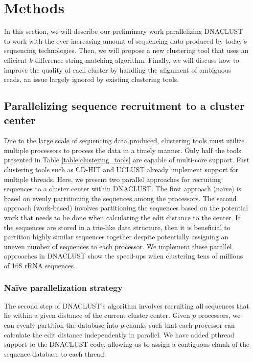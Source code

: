 \section{Methods}

In this section, we will describe our preliminary work parallelizing DNACLUST to work with the ever-increasing amount of sequencing data produced by today's sequencing technologies.
Then, we will propose a new clustering tool that uses an efficient $k$-difference string matching algorithm.
Finally, we will discuss how to improve the quality of each cluster by handling the alignment of ambiguous reads, an issue largely ignored by existing clustering tools.

\subsection{Parallelizing sequence recruitment to a cluster center}

Due to the large scale of sequencing data produced, clustering tools must utilize multiple processors to process the data in a timely manner.  Only half the tools presented in Table \ref{table:clustering_tools} are capable of multi-core support. Fast clustering tools such as CD-HIT and UCLUST already implement support for multiple threads.
Here, we present two parallel approaches for recruiting sequences to a cluster center within DNACLUST.
The first approach (na{\"i}ve) is based on evenly partitioning the sequences among the processors.
The second approach (work-based) involves partitioning the sequences based on the potential work that needs to be done when calculating the edit distance to the center.
If the sequences are stored in a trie-like data structure, then it is beneficial to partition highly similar sequences together despite potentially assigning an uneven number of sequences to each processor.
We implement these parallel approaches in DNACLUST show the speed-ups when clustering tens of millions of 16S rRNA sequences.

\subsubsection{Na{\"i}ve parallelization strategy}

The second step of DNACLUST's algorithm involves recruiting all sequences that lie within a given distance of the current cluster center.
Given $p$ processors, we can evenly partition the database into $p$ chunks such that each processor can calculate the edit distance independently in parallel.
We have added pthread support to the DNACLUST code, allowing us to assign a contiguous chunk of the sequence database to each thread.

